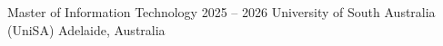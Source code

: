 \resumeEducation
  {Master of Information Technology}
  {2025 -- 2026}
  {University of South Australia (UniSA)}
  {Adelaide, Australia}
